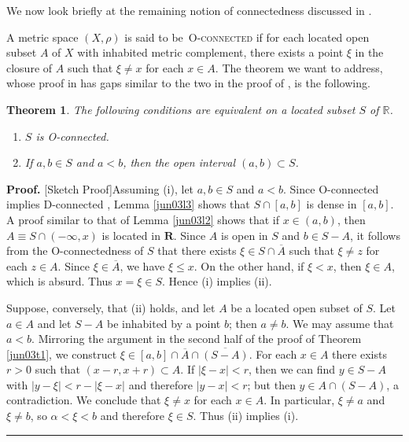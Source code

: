 \documentclass[11pt]{article}%
\newtheorem{theorem}{Theorem}
\newenvironment{proof}[1][Proof]{\noindent\textbf{#1.} }{\ \rule{0.5em}{0.5em}}
\begin{document}
%

\medskip


We now look briefly at the remaining notion of connectedness discussed in
\cite{dsb,dsb78a,dsbcon77,MarkM78}.

A metric space $(X,\rho)$ is said to be\ O-\textsc{connected} if for each
located open subset $A$ of $X$ with inhabited metric complement, there exists
a point $\xi$ in the closure of $A$ such that $\xi\neq x$ for each $x\in A$.
The theorem we want to address, whose proof in \cite{dsb} has gaps similar to
the two in the proof of \cite[Thm 1]{dsb}, is the following.

\begin{theorem}
\label{jun06t1}The following conditions are equivalent on a located subset $S
$ of $\mathbb{R}$.

\begin{enumerate}
\item[\emph{(i)}] $S$ is O-connected.

\item[\emph{(ii)}] If $a,b\in S$ and $a<b$, then the open interval $\left(
a,b\right)  \subset S$.
\end{enumerate}
\end{theorem}

\begin{proof}
[Sketch Proof]Assuming (i), let $a,b\in S$ and $a<b$. Since O-connected
implies D-connected \cite[2.1]{dsbcon77}, Lemma \ref{jun03l3} shows that
$S\cap\left[  a,b\right]  $ is dense in $\left[  a,b\right]  $. A proof
similar to that of Lemma \ref{jun03l2} shows that if $x\in\left(  a,b\right)
$, then $A\equiv S\cap(-\infty,x)$ is located in $\mathbf{R}$. Since $A$ is
open in $S$ and $b\in S-A$, it follows from the O-connectedness of $S$ that
there exists $\xi\in S\cap\overline{A}$ such that $\xi\neq z$ for each $z\in
A$. Since $\xi\in\overline{A}$, we have $\xi\leq x$. On the other hand, if
$\xi<x$, then $\xi\in A$, which is absurd. Thus $x=\xi\in S$. Hence (i)
implies (ii).

Suppose, conversely, that (ii) holds, and let $A$ be a located open subset of
$S$. Let $a\in A$ and let $S-A$ be inhabited by a point $b$; then $a\neq b$.
We may assume that $a<b$. Mirroring the argument in the second half of the
proof of Theorem \ref{jun03t1}, we construct $\xi\in\left[  a,b\right]
\cap\overline{A}\cap\overline{(S-A)}$. For each $x\in A$ there exists $r>0$
such that $(x-r,x+r)\subset A$. If $\left\vert \xi-x\right\vert <r$, then we
can find $y\in S-A$ with $\left\vert y-\xi\right\vert <r-\left\vert
\xi-x\right\vert $ and therefore $\left\vert y-x\right\vert <r$; but then
$y\in A\cap(S-A)$, a contradiction. We conclude that $\xi\neq x$ for each
$x\in A$. In particular, $\xi\neq a$ and $\xi\neq b$, so $\alpha<\xi<b$ and
therefore $\xi\in S$. Thus (ii) implies (i).
\end{proof}
\end{document}
